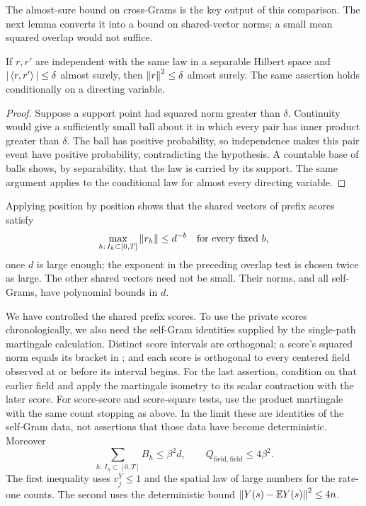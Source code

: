 The almost-sure bound on cross-Grams is the key output of this
comparison.  The next lemma converts it into a bound on shared-vector
norms; a small mean squared overlap would not suffice.

\begin{lemma}
\label{lem:row-overlap-norm}
If $r,r'$ are independent with the same law in a separable Hilbert
space and $|\left\langle r,r'\right\rangle|\le\delta$ almost surely, then
$\left\lVert r\right\rVert^2\le\delta$ almost surely.  The same assertion holds
conditionally on a directing variable.
\end{lemma}

\begin{proof}
Suppose a support point had squared norm greater than $\delta$.
Continuity would give a sufficiently small ball about it in which every
pair has inner product greater than $\delta$.  The ball has positive
probability, so independence makes this pair event have positive
probability, contradicting the hypothesis.  A countable base of balls
shows, by separability, that the law is carried by its support.  The
same argument applies to the conditional law for almost every directing
variable.
\end{proof}

Applying  position by position shows that the
shared vectors of prefix scores satisfy
\begin{equation}
 \max_{h:\,I_h\subset[0,T]}\left\lVert r_h\right\rVert\le d^{-b}
 \quad\text{for every fixed }b,
 \label{eq:row-small-shared-score}
\end{equation}
once $d$ is large enough; the exponent in the preceding overlap test
is chosen twice as large.  The other shared vectors need not be small.
Their norms, and all self-Grams, have polynomial bounds in $d$.

We have controlled the shared prefix scores.  To use the private
scores chronologically, we also need the self-Gram identities supplied
by the single-path martingale calculation.  Distinct score intervals
are orthogonal; a score's squared norm equals its bracket in
; and each score is orthogonal to
every centered field observed at or before its interval begins.  For the last assertion, condition on that earlier
field and apply the martingale isometry to its scalar contraction
with the later score.  For score-score and score-square tests, use the
product martingale with the same count stopping as above.  In the
limit these are identities of the self-Gram data, not assertions that
those data have become deterministic.  Moreover
\begin{equation}
 \sum_{h:\,I_h\subset[0,T]} B_h\le \beta^2d,
 \qquad Q_{\mathrm{field},\mathrm{field}}\le4\beta^2.
 \label{eq:row-gram-budgets}
\end{equation}
The first inequality uses $v_j^Y\le1$ and the spatial law of large
numbers for the rate-one counts.  The second uses the deterministic
bound $\left\lVert Y(s)-\mathbb E Y(s)\right\rVert^2\le4n$.

